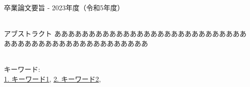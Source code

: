 卒業論文要旨 - 2023年度（令和5年度）
\begin{center}
\begin{large}
\end{large}
\end{center}

~ \\

アブストラクト
あああああああああああああああああああああああああああああああああああああああああああああああああ

~ \\
キーワード:\\
\underline{1. キーワード1},
\underline{2. キーワード2},
\begin{flushright}
\dept \\
\author
\end{flushright}
